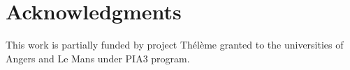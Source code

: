 \documentclass[french]{pfia}
\begin{document}
\section*{Acknowledgments}
This work is partially funded by project Thélème granted to the universities of Angers and Le Mans under PIA3 program.
%
%




\end{document}
